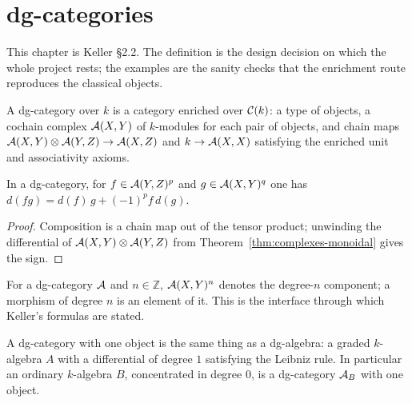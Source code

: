 \chapter{dg-categories}
\label{ch:dgcat}

This chapter is Keller \S 2.2. The definition is the design decision on which the whole
project rests; the examples are the sanity checks that the enrichment route reproduces
the classical objects.

\begin{definition}[dg-category]
\label{def:dg-category}
A dg-category over $k$ is a category enriched over $\mathcal{C}(k)$: a type of objects, a cochain
complex $\mathcal{A}(X,Y)$ of $k$-modules for each pair of objects, and chain maps
$\mathcal{A}(X,Y) \otimes \mathcal{A}(Y,Z) \to \mathcal{A}(X,Z)$ and $k \to \mathcal{A}(X,X)$ satisfying the enriched
unit and associativity axioms.
\end{definition}

\begin{lemma}
\label{lem:leibniz}
In a dg-category, for $f \in \mathcal{A}(Y,Z)^p$ and $g \in \mathcal{A}(X,Y)^q$ one has
$d(f g) = d(f)\, g + (-1)^p f\, d(g)$.
\end{lemma}
\begin{proof}
Composition is a chain map out of the tensor product; unwinding the differential of
$\mathcal{A}(X,Y) \otimes \mathcal{A}(Y,Z)$ from Theorem~\ref{thm:complexes-monoidal} gives the sign.
\end{proof}

\begin{definition}
\label{def:graded-hom}
For a dg-category $\mathcal{A}$ and $n \in \mathbb{Z}$, $\mathcal{A}(X,Y)^n$ denotes the degree-$n$
component; a morphism of degree $n$ is an element of it. This is the interface through
which Keller's formulas are stated.
\end{definition}

\begin{example}[dg-algebras]
\label{ex:dg-algebra}
A dg-category with one object is the same thing as a dg-algebra: a graded $k$-algebra $A$
with a differential of degree $1$ satisfying the Leibniz rule. In particular an ordinary
$k$-algebra $B$, concentrated in degree $0$, is a dg-category $\mathcal{A}_B$ with one object.
\end{example}

